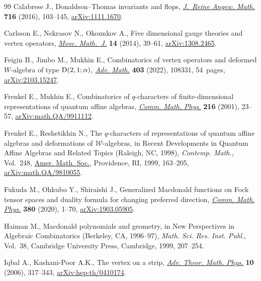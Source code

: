 \documentclass[10pt,a4paper]{amsart}
\numberwithin{equation}{section}
\begin{document}
\begin{thebibliography}{99}
Calabrese J., Donaldson--{T}homas invariants and flops, \href{https://doi.org/10.1515/crelle-2014-0017}{\textit{J.~Reine Angew.
 Math.}} \textbf{716} (2016), 103--145, \href{https://arxiv.org/abs/1111.1670}{arXiv:1111.1670}.

Carlsson E., Nekrasov N., Okounkov A., Five dimensional gauge theories and
 vertex operators, \href{https://doi.org/10.17323/1609-4514-2014-14-1-39-61}{\textit{Mosc. Math.~J.}} \textbf{14} (2014), 39--61,
 \href{https://arxiv.org/abs/1308.2465}{arXiv:1308.2465}.

Feigin B., Jimbo M., Mukhin E., Combinatorics of vertex operators and deformed
 $W$-algebra of type {${\rm D}(2, 1; \alpha)$}, \href{https://doi.org/10.1016/j.aim.2022.108331}{\textit{Adv. Math.}}
 \textbf{403} (2022), 108331, 54~pages, \href{https://arxiv.org/abs/2103.15247}{arXiv:2103.15247}.

Frenkel E., Mukhin E., Combinatorics of $q$-characters of finite-dimensional
 representations of quantum affine algebras, \href{https://doi.org/10.1007/s002200000323}{\textit{Comm. Math. Phys.}}
 \textbf{216} (2001), 23--57, \href{https://arxiv.org/abs/math.QA/9911112}{arXiv:math.QA/9911112}.

Frenkel E., Reshetikhin N., The {$q$}-characters of representations of quantum
 affine algebras and deformations of {$\mathcal W$}-algebras, in Recent
 Developments in Quantum Affine Algebras and Related Topics ({R}aleigh, {NC},
 1998), \textit{Contemp. Math.}, Vol.~248, \href{https://doi.org/10.1090/conm/248/03823}{Amer. Math. Soc.}, Providence, RI,
 1999, 163--205, \href{https://arxiv.org/abs/math.QA/9810055}{arXiv:math.QA/9810055}.

Fukuda M., Ohkubo Y., Shiraishi J., Generalized {M}acdonald functions on {F}ock
 tensor spaces and duality formula for changing preferred direction,
 \href{https://doi.org/10.1007/s00220-020-03872-4}{\textit{Comm. Math. Phys.}} \textbf{380} (2020), 1--70, \href{https://arxiv.org/abs/1903.05905}{arXiv:1903.05905}.

Haiman M., Macdonald polynomials and geometry, in New Perspectives in Algebraic
 Combinatorics ({B}erkeley, {CA}, 1996--97), \textit{Math. Sci. Res. Inst.
 Publ.}, Vol.~38, Cambridge University Press, Cambridge, 1999, 207--254.

Iqbal A., Kashani-Poor A.K., The vertex on a strip, \href{https://dx.doi.org/10.4310/ATMP.2006.v10.n3.a2}{\textit{Adv. Theor. Math.
 Phys.}} \textbf{10} (2006), 317--343, \href{https://arxiv.org/abs/hep-th/0410174}{arXiv:hep-th/0410174}.


\end{thebibliography}
\end{document}
